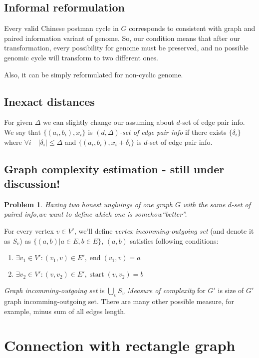 \documentclass[12pt,a4paper,oneside]{article}
\newtheorem{problem}{Problem}
\begin{document}
\subsection{Informal reformulation}
Every valid Chinese postman cycle in $G$ corresponds to consistent with graph and paired information variant of genome. So, our condition means that after our transformation, every possibility for genome must be preserved, and no possible genomic cycle will transform to two different ones.

Also, it can be simply reformulated for non-cyclic genome.

\subsection{Inexact distances}

For given $\Delta$ we can slightly change our assuming about $d$-set of edge pair info.  We say that $\{(a_i, b_i), x_i\}$ is \emph{$(d, \Delta)$-set of edge pair info} if there exists $\{\delta_i\}$ where $\forall i \quad |\delta_i|\leq \Delta$ and $\{(a_i, b_i), x_i+\delta_i\}$ is $d$-set of edge pair info.

\subsection{Graph complexity estimation - still under discussion!}
\begin{problem}
   Having two honest ungluings of one graph $G$ with the same $d$-set of paired info,we want to define which one is somehow``better''.
\end{problem}
  For every vertex $v \in V'$, we'll define \emph{vertex incomming-outgoing set} (and denote it as $S_v$)  as $\{(a, b)| a\in E, b\in E\}$, $(a, b)$ satisfies following conditions:
\begin{enumerate}
 \item $\exists v_1 \in V' : (v_1, v) \in E', \mathop{end}(v_1, v) = a$
 \item $\exists v_2 \in V' : (v, v_2) \in E', \mathop{start}(v, v_2) = b$
\end{enumerate}
 
\emph{Graph incomming-outgoing set} is $\bigcup_v S_v$
\emph{Measure of complexity} for $G'$ is size of $G'$ graph incomming-outgoing set.
There are many other possible measure, for example, minus sum of all edges length.

\section{Connection with rectangle graph}
\end{document}

